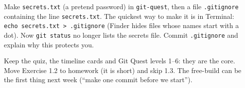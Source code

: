 \begin{stretchchallenge}
Make \texttt{secrets.txt} (a pretend password) in \texttt{git-quest}, then a file \texttt{.gitignore} containing the line \texttt{secrets.txt}. The quickest way to make it is in Terminal: \texttt{echo secrets.txt > .gitignore} (Finder hides files whose names start with a dot). Now \texttt{git status} no longer lists the secrets file. Commit \texttt{.gitignore} and explain why this protects you.
\end{stretchchallenge}

\begin{teachernote}
Keep the quiz, the timeline cards and Git Quest levels 1--6: they are the core. Move Exercise 1.2 to homework (it is short) and skip 1.3. The free-build can be the first thing next week (\enquote{make one commit before we start}).
\end{teachernote}
